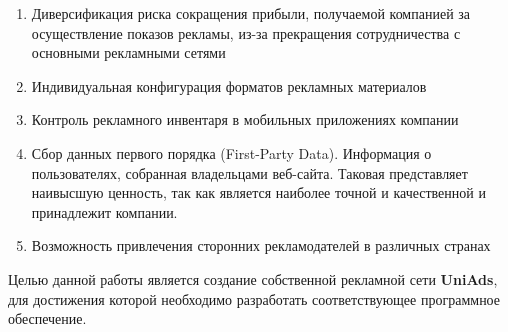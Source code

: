 \documentclass[times]{itmo-student-thesis}
\begin{document}
\begin{enumerate}
	\item Диверсификация риска сокращения прибыли, получаемой компанией за осуществление показов рекламы, из-за прекращения сотрудничества с основными рекламными сетями
	\item Индивидуальная конфигурация форматов рекламных материалов
	\item Контроль рекламного инвентаря в мобильных приложениях компании
	\item Сбор данных первого порядка (First-Party Data). Информация о пользователях, собранная владельцами веб-сайта. Таковая представляет наивысшую ценность, так как является наиболее точной и качественной и принадлежит компании.
	\item Возможность привлечения сторонних рекламодателей в различных странах
\end{enumerate}
\bigbreak


Целью данной работы является создание собственной рекламной сети \textbf{UniAds}, для достижения которой необходимо разработать соответствующее программное обеспечение.



\end{document}
